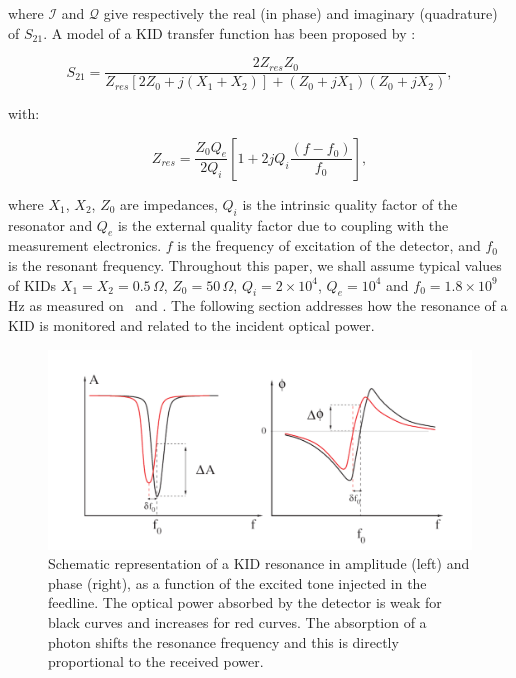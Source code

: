 \noindent where $\mathcal{I}$ and $\mathcal{Q}$ give respectively the real (in phase) and imaginary
(quadrature) of $S_{21}$. A model of a KID transfer function has been proposed
by \citet{2008ApPhL..93m4102G} :

\begin{equation}
S_{21} = \frac{2Z_{res}Z_{0}}{Z_{res}[2Z_{0} + j(X_{1}+X_{2})] + (Z_{0} +jX_{1})(Z_{0} +jX_{2})},
\end{equation}

with:

\begin{equation}
Z_{res} = \frac{Z_{0}Q_{e}}{2Q_{i}}[1 + 2jQ_{i}\frac{(f-f_{0})}{f_{0}}],
\end{equation}

\noindent where $X_{1}$, $X_{2}$, $Z_{0}$ are impedances, $Q_{i}$ is the
intrinsic quality factor of the resonator and $Q_{e}$ is the external quality
factor due to coupling with the measurement electronics. $f$ is the frequency of
excitation of the detector, and $f_{0}$ is the resonant frequency. Throughout
this paper, we shall assume typical values of KIDs $X_{1} = X_{2} =
0.5\,\Omega$, $Z_{0} = 50\,\Omega$, $Q_i=2\times 10^4$, $Q_e=10^4$ and $f_{0} =
1.8\times 10^9$\,Hz as measured on \nika\ and \nikad. The following section
addresses how the resonance of a KID is monitored and related to the incident
optical power.

\begin{figure}
  \includegraphics[clip, angle=0, width=\columnwidth]{Figures/resonance.png}
  \caption{Schematic representation of a KID resonance in amplitude (left) and phase (right), as a function of the excited tone injected in the feedline. The optical power absorbed by the detector is weak for black curves and increases for red curves. The absorption of a photon shifts the resonance frequency and this is directly proportional to the received power.}
  \label{fig:resonance}
\end{figure}



